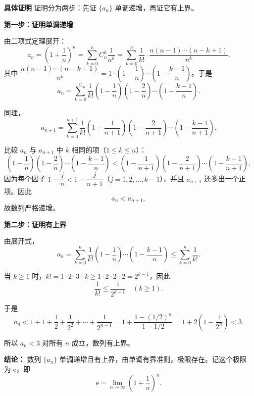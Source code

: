 \documentclass[fontset=fandol]{ctexart}
\newenvironment{custom}[1]{\par\noindent\textbf{#1}\quad}{\par\vspace{0.8em}}
\newcommand{\ee}{\mathrm{e}}
\begin{document}
\begin{custom}{具体证明}
	证明分为两步：先证 \(\{a_n\}\) 单调递增，再证它有上界。
	
	\noindent\textbf{第一步：证明单调递增}
	
	由二项式定理展开：
	\[
	a_n = \left(1+\dfrac{1}{n}\right)^n = \sum\limits_{k=0}^{n} C_n^k \dfrac{1}{n^k} = \sum_{k=0}^{n} \dfrac{1}{k!} \cdot \dfrac{n(n-1)\cdots(n-k+1)}{n^k}.
	\]
	其中 \(\dfrac{n(n-1)\cdots(n-k+1)}{n^k} = 1 \cdot \left(1-\dfrac{1}{n}\right) \cdots \left(1-\dfrac{k-1}{n}\right)\)。于是
	\[
	a_n = \sum_{k=0}^{n} \dfrac{1}{k!} \left(1-\dfrac{1}{n}\right)\left(1-\dfrac{2}{n}\right)\cdots\left(1-\dfrac{k-1}{n}\right).
	\]
	
	同理，
	\[
	a_{n+1} = \sum_{k=0}^{n+1} \dfrac{1}{k!} \left(1-\dfrac{1}{n+1}\right)\left(1-\dfrac{2}{n+1}\right)\cdots\left(1-\dfrac{k-1}{n+1}\right).
	\]
	
	比较 \(a_n\) 与 \(a_{n+1}\) 中 \(k\) 相同的项（\(1 \leq k \leq n\)）：
	\[
	\left(1-\dfrac{1}{n}\right)\left(1-\dfrac{2}{n}\right)\cdots\left(1-\dfrac{k-1}{n}\right) < \left(1-\dfrac{1}{n+1}\right)\left(1-\dfrac{2}{n+1}\right)\cdots\left(1-\dfrac{k-1}{n+1}\right),
	\]
	因为每个因子 \(1-\dfrac{j}{n}<1-\dfrac{j}{n+1}\)（\(j=1,2,\dots,k-1\)），并且 \(a_{n+1}\) 还多出一个正项。因此
	\[
	a_n < a_{n+1},
	\]
	故数列严格递增。
	
	\noindent\textbf{第二步：证明有上界}
	
	由展开式，
	\[
	a_n = \sum_{k=0}^{n} \dfrac{1}{k!} \left(1-\dfrac{1}{n}\right)\cdots\left(1-\dfrac{k-1}{n}\right) \leq \sum_{k=0}^{n} \dfrac{1}{k!}.
	\]
	
	当 \(k \geq 1\) 时，\(k! = 1 \cdot 2 \cdot 3 \cdots k \geq 1 \cdot 2 \cdot 2 \cdots 2 = 2^{k-1}\)，因此
	\[
	\dfrac{1}{k!} \leq \dfrac{1}{2^{k-1}} \quad (k \geq 1).
	\]
	
	于是
	\[
	a_n < 1 + 1 + \dfrac{1}{2} + \dfrac{1}{2^2} + \cdots + \dfrac{1}{2^{n-1}} = 1 + \dfrac{1 - (1/2)^n}{1 - 1/2} = 1 + 2\left(1 - \dfrac{1}{2^n}\right) < 3.
	\]
	
	所以 \(a_n < 3\) 对所有 \(n\) 成立，数列有上界。
	
	\noindent\textbf{结论：} 数列 \(\{a_n\}\) 单调递增且有上界，由单调有界准则，极限存在。记这个极限为 \(\ee\)，即
	\[
	\ee = \lim_{n\to\infty} \left(1+\dfrac{1}{n}\right)^n.
	\]
\end{custom}
\end{document}
